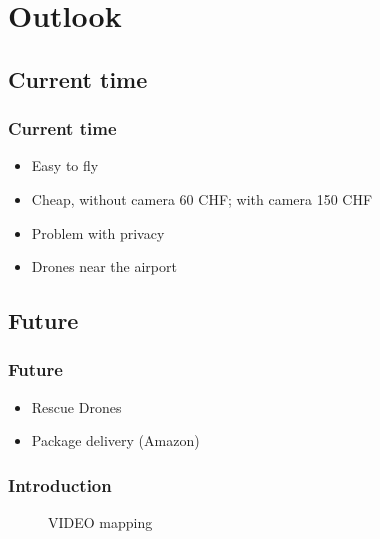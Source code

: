\section{Outlook}

\begin{frame}
\tableofcontents[
    currentsection, 
    sectionstyle=show/shaded, 
    subsectionstyle=hide
]
\end{frame}


\subsection*{Current time}
\begin{frame}
\frametitle{Current time}

  \begin{itemize}
    \item Easy to fly
    \item Cheap, without camera 60 CHF; with camera 150 CHF 
    \item Problem with privacy    
    \item Drones near the airport
  \end{itemize}
\end{frame}


\subsection*{Future}
\begin{frame}
\frametitle{Future}

  \begin{itemize}
    \item Rescue Drones   
    \item Package delivery (Amazon)
  \end{itemize}
\end{frame}


\begin{frame}
\frametitle{Introduction}
\begin{figure}[H]
  \begin{center}
  VIDEO mapping
  \end{center}
\end{figure}

\end{frame}